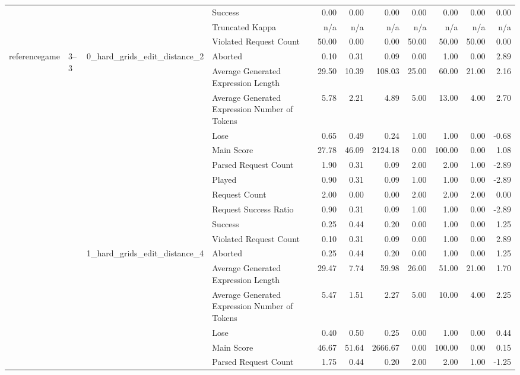 \begin{tabular}{llllrrrrrrr}
 &  &  & Success & 0.00 & 0.00 & 0.00 & 0.00 & 0.00 & 0.00 & 0.00 \\
 &  &  & Truncated Kappa & n/a & n/a & n/a & n/a & n/a & n/a & n/a \\
 &  &  & Violated Request Count & 50.00 & 0.00 & 0.00 & 50.00 & 50.00 & 50.00 & 0.00 \\
\cline{1-11} \cline{2-11} \cline{3-11}
\multirow[t]{242}{*}{referencegame} & \multirow[t]{22}{*}{3--3} & \multirow[t]{11}{*}{0_hard_grids_edit_distance_2} & Aborted & 0.10 & 0.31 & 0.09 & 0.00 & 1.00 & 0.00 & 2.89 \\
 &  &  & Average Generated Expression Length & 29.50 & 10.39 & 108.03 & 25.00 & 60.00 & 21.00 & 2.16 \\
 &  &  & Average Generated Expression Number of Tokens & 5.78 & 2.21 & 4.89 & 5.00 & 13.00 & 4.00 & 2.70 \\
 &  &  & Lose & 0.65 & 0.49 & 0.24 & 1.00 & 1.00 & 0.00 & -0.68 \\
 &  &  & Main Score & 27.78 & 46.09 & 2124.18 & 0.00 & 100.00 & 0.00 & 1.08 \\
 &  &  & Parsed Request Count & 1.90 & 0.31 & 0.09 & 2.00 & 2.00 & 1.00 & -2.89 \\
 &  &  & Played & 0.90 & 0.31 & 0.09 & 1.00 & 1.00 & 0.00 & -2.89 \\
 &  &  & Request Count & 2.00 & 0.00 & 0.00 & 2.00 & 2.00 & 2.00 & 0.00 \\
 &  &  & Request Success Ratio & 0.90 & 0.31 & 0.09 & 1.00 & 1.00 & 0.00 & -2.89 \\
 &  &  & Success & 0.25 & 0.44 & 0.20 & 0.00 & 1.00 & 0.00 & 1.25 \\
 &  &  & Violated Request Count & 0.10 & 0.31 & 0.09 & 0.00 & 1.00 & 0.00 & 2.89 \\
\cline{3-11}
 &  & \multirow[t]{11}{*}{1_hard_grids_edit_distance_4} & Aborted & 0.25 & 0.44 & 0.20 & 0.00 & 1.00 & 0.00 & 1.25 \\
 &  &  & Average Generated Expression Length & 29.47 & 7.74 & 59.98 & 26.00 & 51.00 & 21.00 & 1.70 \\
 &  &  & Average Generated Expression Number of Tokens & 5.47 & 1.51 & 2.27 & 5.00 & 10.00 & 4.00 & 2.25 \\
 &  &  & Lose & 0.40 & 0.50 & 0.25 & 0.00 & 1.00 & 0.00 & 0.44 \\
 &  &  & Main Score & 46.67 & 51.64 & 2666.67 & 0.00 & 100.00 & 0.00 & 0.15 \\
 &  &  & Parsed Request Count & 1.75 & 0.44 & 0.20 & 2.00 & 2.00 & 1.00 & -1.25 \\

\end{tabular}
